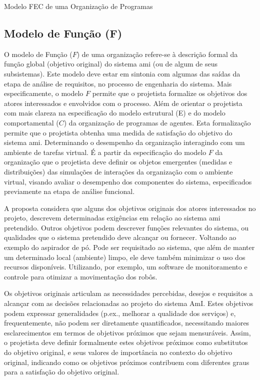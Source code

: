 \begin{section}{Modelo FEC de uma Organização de Programas}
    \subsection{Modelo de Função (F)}
    \label{modelo-fec-f}
    
    O modelo de Função ($F$) de uma organização refere-se à descrição formal da função global (objetivo original) do sistema \acrshort{ami} (ou de algum de seus subsistemas). Este modelo deve estar em sintonia com algumas das saídas da etapa de análise de requisitos, no processo de engenharia do sistema. Mais especificamente, o modelo $F$ permite que o projetista formalize os objetivos dos atores interessados e envolvidos com o processo. Além de orientar o projetista com mais clareza na especificação do modelo estrutural (E) e do modelo comportamental ($C$) da organização de programas de agentes. Esta formalização permite que o projetista obtenha uma medida de satisfação do objetivo do sistema \acrshort{ami}. Determinando o desempenho da organização interagindo com um ambiente de tarefas virtual. É a partir da especificação do modelo $F$ da organização que o projetista deve definir os objetos emergentes (medidas e distribuições) das simulações de interações da organização com o ambiente virtual, visando avaliar o desempenho dos componentes do sistema, especificados previamente na etapa de análise funcional.

    A proposta considera que alguns dos objetivos originais dos atores interessados no projeto, descrevem determinadas exigências em relação ao sistema \acrshort{ami} pretendido. Outros objetivos podem descrever funções relevantes do sistema, ou qualidades que o sistema pretendido deve alcançar ou fornecer. Voltando ao exemplo do aspirador de pó. Pode ser requisitado ao sistema, que além de manter um determinado local  (ambiente) limpo, ele deve também minimizar o uso dos recursos disponíveis. Utilizando, por exemplo, um software de monitoramento e controle para otimizar a movimentação dos robôs.
    
    Os objetivos originais articulam as necessidades percebidas, desejos e requisitos a alcançar com as decisões relacionadas ao projeto do sistema AmI. Estes objetivos podem expressar generalidades (p.ex., melhorar a qualidade dos serviços) e, frequentemente, não podem ser diretamente quantificados, necessitando maiores esclarecimentos em termos de objetivos próximos que sejam mensuráveis. Assim, o projetista deve definir formalmente estes objetivos próximos como substitutos do objetivo original, e seus valores de importância no contexto do objetivo original, indicando como os objetivos próximos contribuem com diferentes graus para a satisfação do objetivo original.
    

\end{section}

